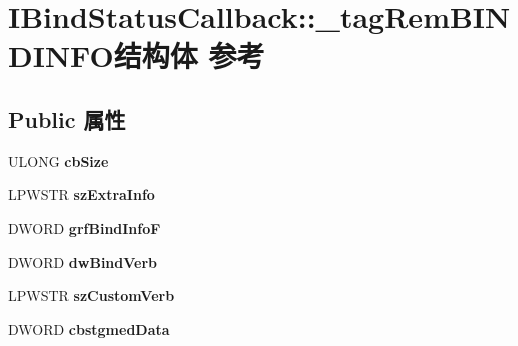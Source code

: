 \hypertarget{struct_i_bind_status_callback_1_1__tag_rem_b_i_n_d_i_n_f_o}{}\section{I\+Bind\+Status\+Callback\+:\+:\+\_\+tag\+Rem\+B\+I\+N\+D\+I\+N\+F\+O结构体 参考}
\label{struct_i_bind_status_callback_1_1__tag_rem_b_i_n_d_i_n_f_o}
\subsection*{Public 属性}
\begin{DoxyCompactItemize}
\item 
\mbox{\label{struct_i_bind_status_callback_1_1__tag_rem_b_i_n_d_i_n_f_o_a98bf30f1cdf1e0515402da4a52c92cfd}} 
U\+L\+O\+NG {\bfseries cb\+Size}
\item 
\mbox{\label{struct_i_bind_status_callback_1_1__tag_rem_b_i_n_d_i_n_f_o_a60b632ea3956e6ecc9dbb398e50a7091}} 
L\+P\+W\+S\+TR {\bfseries sz\+Extra\+Info}
\item 
\mbox{\label{struct_i_bind_status_callback_1_1__tag_rem_b_i_n_d_i_n_f_o_a7c7556f243866ef291b448b7d9220fff}} 
D\+W\+O\+RD {\bfseries grf\+Bind\+InfoF}
\item 
\mbox{\label{struct_i_bind_status_callback_1_1__tag_rem_b_i_n_d_i_n_f_o_a2de9e5566b4f3f0400b5b9efc469de4b}} 
D\+W\+O\+RD {\bfseries dw\+Bind\+Verb}
\item 
\mbox{\label{struct_i_bind_status_callback_1_1__tag_rem_b_i_n_d_i_n_f_o_a27fe0443a0cf92cb7a5d6dd5f8d2d7b0}} 
L\+P\+W\+S\+TR {\bfseries sz\+Custom\+Verb}
\item 
\mbox{\label{struct_i_bind_status_callback_1_1__tag_rem_b_i_n_d_i_n_f_o_a3dcd03278a7217a2d1b549ebcacbbe7c}} 
D\+W\+O\+RD {\bfseries cbstgmed\+Data}
\item 

\end{DoxyCompactItemize}
